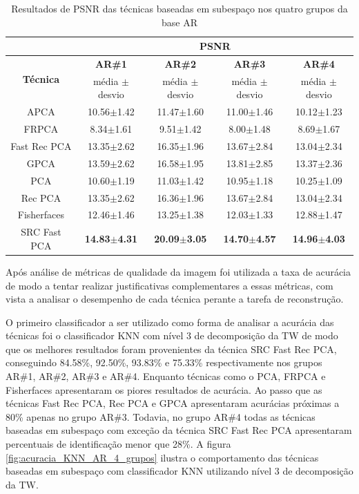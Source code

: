 \begin{table}[H]
\caption{Resultados de PSNR das técnicas baseadas em subespaço nos quatro grupos da base AR}
\centering
\begin{tabular}{|c|c|c|c|c|}
\cline{2-5}
 \multicolumn{1}{c|}{} & \multicolumn{4}{c|}{\textbf{PSNR}}\\ \hline
\multicolumn{1}{|c|}{\multirow{2}{*}{\textbf{Técnica} }}& \textbf{AR\#1} &  \textbf{AR\#2} & \textbf{AR\#3} &\textbf{ AR\#4}   \\ \cline{2-5}
& média $\pm$ desvio & média $\pm$ desvio & média $\pm$ desvio & média $\pm$ desvio \\\hline 
APCA			&10.56$\pm$1.42&	11.47$\pm$1.60&	11.00$\pm$1.46 &	10.12$\pm$1.23 \\\hline
FRPCA			&8.34$\pm$1.61 &	9.51$\pm$1.42 &	8.00$\pm$1.48  &	8.69$\pm$1.67 \\\hline
Fast Rec PCA	&13.35$\pm$2.62&	16.35$\pm$1.96&	13.67$\pm$2.84 &	13.04$\pm$2.34 \\\hline
GPCA			&13.59$\pm$2.62&	16.58$\pm$1.95&	13.81$\pm$2.85 &	13.37$\pm$2.36 \\\hline
PCA				&10.60$\pm$1.19&	11.03$\pm$1.42&	10.95$\pm$1.18 &	10.25$\pm$1.09 \\\hline
Rec PCA			&13.35$\pm$2.62&	16.36$\pm$1.96&	13.67$\pm$2.84 &	13.04$\pm$2.34 \\\hline
Fisherfaces		&12.46$\pm$1.46&	13.25$\pm$1.38&	12.03$\pm$1.33 &	12.88$\pm$1.47 \\\hline
SRC Fast PCA	&\textbf{14.83$\pm$4.31}&	\textbf{20.09$\pm$3.05}&	\textbf{14.70$\pm$4.57} &	\textbf{14.96$\pm$4.03} \\\hline
\end{tabular}
\label{tab:psnr_subespaco}
\end{table}



Após análise de métricas de qualidade da imagem foi utilizada a taxa de acurácia de modo a tentar realizar justificativas complementares a essas métricas, com vista a analisar o desempenho de cada técnica perante a tarefa de reconstrução. 



O primeiro classificador a ser utilizado como forma de analisar a acurácia das técnicas foi o classificador KNN com nível 3 de decomposição da TW de modo que os melhores resultados foram provenientes da técnica SRC Fast Rec PCA, conseguindo 84.58\%, 92.50\%, 93.83\% e 75.33\% respectivamente nos grupos AR\#1, AR\#2, AR\#3 e AR\#4. Enquanto técnicas como o PCA, FRPCA e Fisherfaces apresentaram os piores resultados de acurácia. Ao passo que as técnicas Fast Rec PCA, Rec PCA e GPCA apresentaram acurácias próximas a 80\% apenas no grupo AR\#3. Todavia, no grupo AR\#4 todas as técnicas baseadas em subespaço com exceção da técnica SRC Fast Rec PCA apresentaram percentuais de identificação menor que 28\%. A figura \ref{fig:acuracia_KNN_AR_4_grupos} ilustra o comportamento das técnicas baseadas em subespaço com classificador KNN utilizando nível 3 de decomposição da TW.


